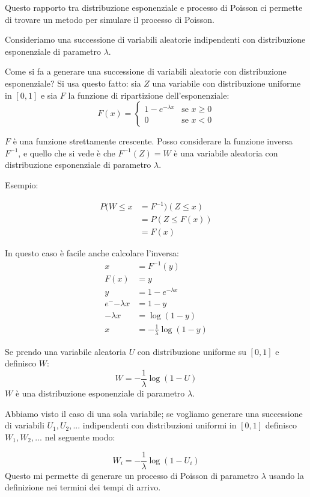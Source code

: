 \documentclass[a4paper,12pt]{book}
\begin{document}
Questo rapporto tra distribuzione esponenziale e processo di Poisson ci permette di trovare un metodo per simulare il processo di Poisson.

Consideriamo una successione di variabili aleatorie indipendenti con distribuzione esponenziale di parametro $\lambda$. 

Come si fa a generare una successione di variabili aleatorie con distribuzione esponenziale? Si usa questo fatto: sia $ Z $ una variabile con distribuzione uniforme in $ [0,1] $ e sia $ F $ la funzione di ripartizione dell'esponenziale:
$$ F(x) = \begin{cases}
	1 - e^{-\lambda x} & \text{se } x \ge 0 \\
	0 & \text{se } x < 0
\end{cases} $$

$ F $ è una funzione strettamente crescente. Posso considerare la funzione inversa $ F^{-1} $, e quello che si vede è che $ F^{-1}(Z) = W $ è una variabile aleatoria con distribuzione esponenziale di parametro $\lambda$. 

Esempio:

\begin{align*}
	P(W \le x & = F^{-1})(Z \le x) \\
	& = P(Z \le F(x)) \\
	& = F(x)
\end{align*}

In questo caso è facile anche calcolare l'inversa:
\begin{align*}
	x & = F^{-1}(y) \\
	F(x) & = y \\ 
	y & = 1 - e^{-\lambda x} \\
	e^-{-\lambda x} & = 1 - y \\
	-\lambda x & = \log(1-y) \\
	x & = - \frac{1}{\lambda} \log (1-y)
\end{align*}

Se prendo una variabile aleatoria $ U $ con distribuzione uniforme su $ [0,1] $ e definisco $ W $:
$$ W = - \frac{1}{\lambda} \log(1 - U) $$
$ W $ è una distribuzione esponenziale di parametro $\lambda$.

Abbiamo visto il caso di una sola variabile; se vogliamo generare una successione di variabili $ U_1, U_2, ... $ indipendenti con distribuzioni uniformi in $ [0,1] $ definisco $ W_1, W_2, ... $ nel seguente modo:

$$ W_i = - \frac{1}{\lambda} \log(1 - U_i) $$
Questo mi permette di generare un processo di Poisson di parametro $\lambda$ usando la definizione nei termini dei tempi di arrivo. 
\end{document}
